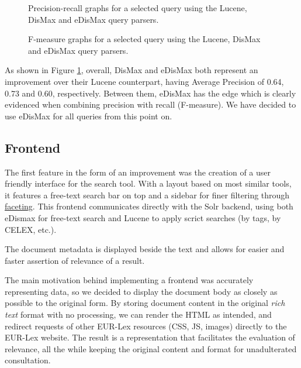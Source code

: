 \documentclass[sigconf, authorversion]{acmart}
\begin{document}
\begin{figure}[ht]
    \centering
    
    
    \caption{Precision-recall graphs for a selected query using the Lucene, DisMax and eDisMax query parsers.} \label{fig:recall-precision-graphs-query-parsers}
\end{figure}

\begin{figure}[ht]
    \centering
    
    \caption{F-measure graphs for a selected query using the Lucene, DisMax and eDisMax query parsers.} \label{fig:f-measure-graphs-query-parsers}
\end{figure}

As shown in Figure \ref{fig:recall-precision-graphs-query-parsers}, overall, DisMax and eDisMax both represent an improvement over their Lucene counterpart, having Average Precision of 0.64, 0.73 and 0.60, respectively. Between them, eDisMax has the edge which is clearly evidenced when combining precision with recall (F-measure). We have decided to use eDisMax for all queries from this point on.

\subsection{Frontend}
The first feature in the form of an improvement was the creation of a user friendly interface for the search tool. With a layout based on most similar tools, it features a free-text search bar on top and a sidebar for finer filtering through \hyperref[sec:faceting]{faceting}. This frontend communicates directly with the Solr backend, using both eDismax for free-text search and Lucene to apply scrict searches (by tags, by CELEX, etc.).

The document metadata is displayed beside the text and allows for easier and faster assertion of relevance of a result.

The main motivation behind implementing a frontend was accurately representing data, so we decided to display the document body as closely as possible to the original form. By storing document content in the original \textit{rich text} format with no processing, we can render the HTML as intended, and redirect requests of other EUR-Lex resources (CSS, JS, images) directly to the EUR-Lex website. The result is a representation that facilitates the evaluation of relevance, all the while keeping the original content and format for unadulterated consultation.
\end{document}
